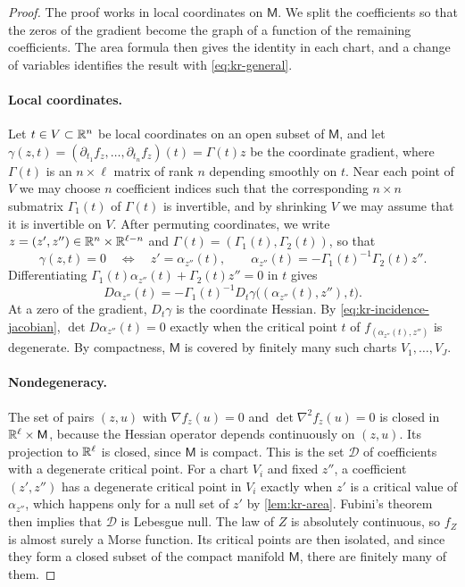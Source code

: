 \begin{proof}
The proof works in local coordinates on $\mathsf M$. We split the coefficients so that the zeros of the gradient become the graph of a function of the remaining coefficients. The area formula then gives the identity in each chart, and a change of variables identifies the result with \eqref{eq:kr-general}.

\paragraph{Local coordinates.}
Let $t\in V\subset\mathbb R^n$ be local coordinates on an open subset of $\mathsf M$, and let $\gamma(z,t)=(\partial_{t_1}f_z,\dots,\partial_{t_n}f_z)(t)=\Gamma(t)z$ be the coordinate gradient, where $\Gamma(t)$ is an $n\times\ell$ matrix of rank $n$ depending smoothly on $t$. Near each point of $V$ we may choose $n$ coefficient indices such that the corresponding $n\times n$ submatrix $\Gamma_1(t)$ of $\Gamma(t)$ is invertible, and by shrinking $V$ we may assume that it is invertible on $V$. After permuting coordinates, we write $z=(z',z'')\in\mathbb R^n\times\mathbb R^{\ell-n}$ and $\Gamma(t)=(\Gamma_1(t),\Gamma_2(t))$, so that
\[
\gamma(z,t)=0\quad\Longleftrightarrow\quad z'=\alpha_{z''}(t),\qquad \alpha_{z''}(t)=-\Gamma_1(t)^{-1}\Gamma_2(t)z''.
\]
Differentiating $\Gamma_1(t)\alpha_{z''}(t)+\Gamma_2(t)z''=0$ in $t$ gives
\begin{equation}\label{eq:kr-incidence-jacobian}
D\alpha_{z''}(t)=-\Gamma_1(t)^{-1}D_t\gamma\big((\alpha_{z''}(t),z''),t\big).
\end{equation}
At a zero of the gradient, $D_t\gamma$ is the coordinate Hessian. By \eqref{eq:kr-incidence-jacobian}, $\det D\alpha_{z''}(t)=0$ exactly when the critical point $t$ of $f_{(\alpha_{z''}(t),z'')}$ is degenerate. By compactness, $\mathsf M$ is covered by finitely many such charts $V_1,\dots,V_J$.

\paragraph{Nondegeneracy.}
The set of pairs $(z,u)$ with $\nabla f_z(u)=0$ and $\det\nabla^2f_z(u)=0$ is closed in $\mathbb R^\ell\times\mathsf M$, because the Hessian operator depends continuously on $(z,u)$. Its projection to $\mathbb R^\ell$ is closed, since $\mathsf M$ is compact. This is the set $\mathcal D$ of coefficients with a degenerate critical point. For a chart $V_i$ and fixed $z''$, a coefficient $(z',z'')$ has a degenerate critical point in $V_i$ exactly when $z'$ is a critical value of $\alpha_{z''}$, which happens only for a null set of $z'$ by \cref{lem:kr-area}. Fubini's theorem then implies that $\mathcal D$ is Lebesgue null. The law of $Z$ is absolutely continuous, so $f_Z$ is almost surely a Morse function. Its critical points are then isolated, and since they form a closed subset of the compact manifold $\mathsf M$, there are finitely many of them.


\end{proof}

